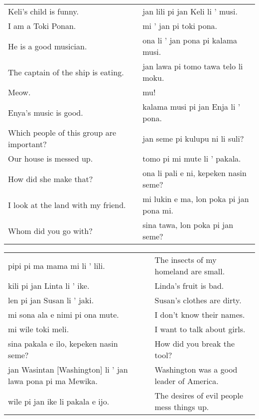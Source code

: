 \begin{supertabular}{p{5,5cm}|ll}
Keli's child is funny.  && jan lili pi jan Keli li ' musi. \\ %
I am a Toki Ponan.  && mi ' jan pi toki pona. \\ %
He is a good musician.  && ona li ' jan pona pi kalama musi. \\ %
The captain of the ship is eating.  && jan lawa pi tomo tawa telo li moku. \\ %
Meow.  && mu! \\ %
Enya's music is good.  && kalama musi pi jan Enja li ' pona. \\ %
Which people of this group are important?  && jan seme pi kulupu ni li suli? \\ %
Our house is messed up.  && tomo pi mi mute li ' pakala. \\ %
How did she make that?  && ona li pali e ni, kepeken nasin seme? \\ %
I look at the land with my friend.  && mi lukin e ma, lon poka pi jan pona mi. \\ %
Whom did you go with?  && sina tawa, lon poka pi jan seme? \\ %
\end{supertabular}  

\begin{supertabular}{p{5,5cm}|ll}
pipi pi ma mama mi li ' lili. && The insects of my homeland are small. \\
kili pi jan Linta li ' ike.  && Linda's fruit is bad. \\
len pi jan Susan li ' jaki.  && Susan's clothes are dirty. \\
mi sona ala e nimi pi ona mute.  && I don't know their names. \\
mi wile toki meli.  && I want to talk about girls. \\
sina pakala e ilo, kepeken nasin seme?  && How did you break the tool? \\
jan Wasintan [Washington] li ' jan lawa pona pi ma Mewika.  && Washington was a good leader of America. \\
wile pi jan ike li pakala e ijo.  && The desires of evil people mess things up. \\
\end{supertabular}  

